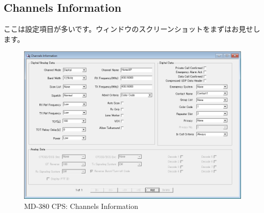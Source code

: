 \documentclass[a4j,oneside]{ujbook}
\begin{document}
\subsection*{Channels Information}

ここは設定項目が多いです。ウィンドウのスクリーンショットをまずはお見せします。

\begin{figure}[H]
 \begin{center}
  \includegraphics[width=15cm]{img/md380cps-channelinfo.png}
 \end{center}
 \caption{MD-380 CPS: Channels Information}
\end{figure}
\end{document}
